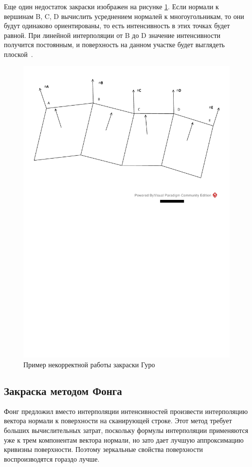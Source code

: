 Еще один недостаток закраски изображен на рисунке \ref{fig:Guro_book}. Если нормали к вершинам B, C, D вычислить усреднением нормалей к многоугольникам, то они будут одинаково ориентированы, то есть интенсивность в этих точках будет равной. При линейной интерполяции от B до D значение интенсивности получится постоянным, и поверхность на данном участке будет выглядеть плоской~\cite{lit5}.

\begin{figure}[H]
	\centering
	\includegraphics[width=1.0\textwidth]{Knizhka.pdf}
	\caption{Пример некорректной работы закраски Гуро}
	\label{fig:Guro_book}
\end{figure}

\subsection{Закраска методом Фонга}
Фонг предложил вместо интерполяции интенсивностей произвести интерполяцию вектора нормали к поверхности на сканирующей строке. Этот метод требует больших вычислительных затрат, поскольку формулы интерполяции применяются уже к трем компонентам вектора нормали, но зато дает лучшую аппроксимацию кривизны поверхности. Поэтому зеркальные свойства поверхности воспроизводятся гораздо лучше.

